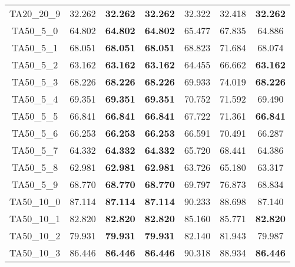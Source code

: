 \begin{tabular}{cc|cc|ccc}
TA20\_20\_9        & 32.262           & {\bf 32.262}     & {\bf 32.262}     & 32.322           & 32.418           & {\bf 32.262}    \\ 
TA50\_5\_0         & 64.802           & {\bf 64.802}     & {\bf 64.802}     & 65.477           & 67.835           & 64.886          \\ 
TA50\_5\_1         & 68.051           & {\bf 68.051}     & {\bf 68.051}     & 68.823           & 71.684           & 68.074          \\ 
TA50\_5\_2         & 63.162           & {\bf 63.162}     & {\bf 63.162}     & 64.455           & 66.662           & {\bf 63.162}    \\ 
TA50\_5\_3         & 68.226           & {\bf 68.226}     & {\bf 68.226}     & 69.933           & 74.019           & {\bf 68.226}    \\ 
TA50\_5\_4         & 69.351           & {\bf 69.351}     & {\bf 69.351}     & 70.752           & 71.592           & 69.490          \\ 
TA50\_5\_5         & 66.841           & {\bf 66.841}     & {\bf 66.841}     & 67.722           & 71.361           & {\bf 66.841}    \\ 
TA50\_5\_6         & 66.253           & {\bf 66.253}     & {\bf 66.253}     & 66.591           & 70.491           & 66.287          \\ 
TA50\_5\_7         & 64.332           & {\bf 64.332}     & {\bf 64.332}     & 65.720           & 68.441           & 64.386          \\ 
TA50\_5\_8         & 62.981           & {\bf 62.981}     & {\bf 62.981}     & 63.726           & 65.180           & 63.317          \\ 
TA50\_5\_9         & 68.770           & {\bf 68.770}     & {\bf 68.770}     & 69.797           & 76.873           & 68.834          \\ 
TA50\_10\_0        & 87.114           & {\bf 87.114}     & {\bf 87.114}     & 90.233           & 88.698           & 87.140          \\ 
TA50\_10\_1        & 82.820           & {\bf 82.820}     & {\bf 82.820}     & 85.160           & 85.771           & {\bf 82.820}    \\ 
TA50\_10\_2        & 79.931           & {\bf 79.931}     & {\bf 79.931}     & 82.140           & 81.943           & 79.987          \\ 
TA50\_10\_3        & 86.446           & {\bf 86.446}     & {\bf 86.446}     & 90.318           & 88.934           & {\bf 86.446}    \\ 

\end{tabular}

